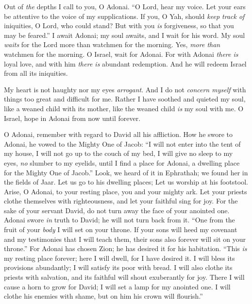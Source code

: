 \begin{biblechapter} %
 Out of \textit{the} depths I call to you, O Adonai.
\verse “O Lord, hear my voice. 
Let your ears be attentive 
to the voice of my supplications.
\verse If you, O Yah, should \textit{keep track of} iniquities, 
O Lord, who could stand?
\verse But with you \textit{is} forgiveness, 
so that you may be feared.”
\verse I await Adonai; my soul awaits, 
and I wait for his word.
\verse My soul \textit{waits} for the Lord 
more than watchmen for the morning. 
Yes, \textit{more than} watchmen for the morning.
\verse O Israel, wait for Adonai. 
For with Adonai \textit{there is} loyal love, 
and with him \textit{there is} abundant redemption.
\verse And he will redeem Israel 
from all its iniquities.
\end{biblechapter}

\begin{biblechapter} %
 My heart is not haughty nor my eyes \textit{arrogant}. 
And I do not \textit{concern myself} 
with things too great and difficult for me.
\verse Rather I have soothed and quieted my soul, 
like a weaned child with its mother, 
like the weaned child \textit{is} my soul with me.
\verse O Israel, hope in Adonai 
from now until forever.
\end{biblechapter}

\begin{biblechapter} %
 O Adonai, remember with regard to David 
all his affliction.
\verse How he swore to Adonai, 
he vowed to the Mighty One of Jacob:
\verse “I will not enter into the tent of my house, 
I will not go up to the couch of my bed,
\verse I will give no sleep to my eyes, 
\textit{no} slumber to my eyelids,
\verse until I find a place for Adonai, 
a dwelling place for the Mighty One of Jacob.”
\verse Look, we heard of it in Ephrathah; 
we found her in the fields of Jaar.
\verse Let us go to his dwelling places; 
Let us worship at his footstool.
\verse Arise, O Adonai, to your resting place, 
you and your mighty ark.
\verse Let your priests clothe themselves with righteousness, 
and let your faithful sing for joy.
\verse For the sake of your servant David, 
do not turn away the face of your anointed one.
\verse Adonai swore \textit{in} truth to David; 
he will not turn back from it. 
“One from the fruit of your \textit{body} 
I will set on your throne.
\verse If your sons will heed my covenant 
and my testimonies that I will teach them, 
their sons also forever 
will sit on your throne.”
\verse For Adonai has chosen Zion; 
he has desired it for his habitation.
\verse “This \textit{is} my resting place forever; 
here I will dwell, for I have desired it.
\verse I will bless its provisions abundantly; 
I will satisfy its poor with bread.
\verse I will also clothe its priests with salvation, 
and its faithful will shout exuberantly for joy.
\verse There I will cause a horn to grow for David; 
I will set a lamp for my anointed one.
\verse I will clothe his enemies with shame, 
but on him his crown will flourish.”
\end{biblechapter}

